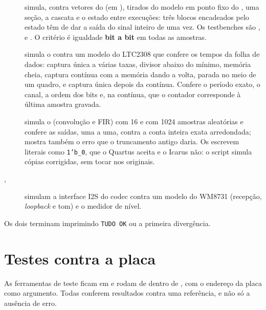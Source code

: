 \begin{description}
  \item[] simula, contra vetores do
     (em ), tirados do modelo
    em ponto fixo do , uma seção, a cascata e o estado entre
    execuções: três blocos encadeados pelo estado têm de dar a saída do sinal
    inteiro de uma vez. Os testbenches são ,
     e . O critério é igualdade
    \textbf{bit a bit} em todas as amostras.
  \item[] simula o  contra um
    modelo do LTC2308 que confere os tempos da folha de dados: captura única a
    várias taxas, divisor abaixo do mínimo, memória cheia, captura contínua com a
    memória dando a volta, parada no meio de um quadro, e captura única depois
    da contínua. Confere o período exato, o canal, a ordem dos bits e, na
    contínua, que o contador corresponde à última amostra gravada.
  \item[] simula o 
    (convolução e FIR) com 16 e com 1024 amostras aleatórias e confere as
    saídas, uma a uma, contra a conta inteira exata arredondada; mostra também
    o erro que o truncamento antigo daria. Os
     escrevem literais como \texttt{1'b\_0}, que o
    Quartus aceita e o Icarus não: o script simula cópias corrigidas, sem
    tocar nos originais.
  \item[, ] simulam a
    interface I2S do codec contra um modelo do WM8731 (recepção,
    \emph{loopback} e tom) e o medidor de nível.
\end{description}

Os dois terminam imprimindo \texttt{TUDO OK} ou a primeira divergência.

\section{Testes contra a placa}
\label{sec:testes}

As ferramentas de teste ficam em  e rodam de dentro de
, com o endereço da placa como argumento. Todas conferem
resultados contra uma referência, e não só a ausência de erro.

